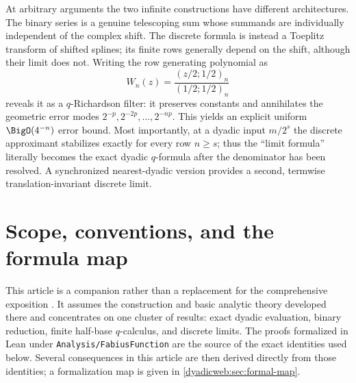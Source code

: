 \documentclass[11pt,oneside]{article}
\theoremstyle{definition}
\theoremstyle{remark}
\newcommand{\repo}{\nolinkurl{Analysis/FabiusFunction}}
\begin{document}
At arbitrary arguments the two infinite constructions have different architectures.  The
binary series is a genuine telescoping sum whose summands are individually independent of the
complex shift.  The discrete formula is instead a Toeplitz transform of shifted splines; its
finite rows generally depend on the shift, although their limit does not.  Writing the row
generating polynomial as
\[
 W_n(z)=\frac{(z/2;1/2)_n}{(1/2;1/2)_n}
\]
reveals it as a $q$-Richardson filter: it preserves constants and annihilates the geometric
error modes $2^{-p},2^{-2p},\ldots,2^{-np}$.  This yields an explicit uniform
$\BigO(4^{-n})$ error bound.  Most importantly, at a dyadic input $m/2^s$ the discrete
approximant stabilizes exactly for every row $n\ge s$; thus the ``limit formula'' literally
becomes the exact dyadic $q$-formula after the denominator has been resolved.  A synchronized
nearest-dyadic version provides a second, termwise translation-invariant discrete limit.


\section{Scope, conventions, and the formula map}
\label{dyadicweb:sec:scope}

This article is a companion rather than a replacement for the comprehensive exposition
\cite{dyadicweb:mainarticle}.  It assumes the construction and basic analytic theory developed there
and concentrates on one cluster of results: exact dyadic evaluation, binary reduction, finite
half-base $q$-calculus, and discrete limits.  The proofs formalized in Lean under \repo
\cite{dyadicweb:proveit} are the source of the exact identities used below.  Several consequences in
this article are then derived directly from those identities; a formalization map is given in
\cref{dyadicweb:sec:formal-map}.
\end{document}
